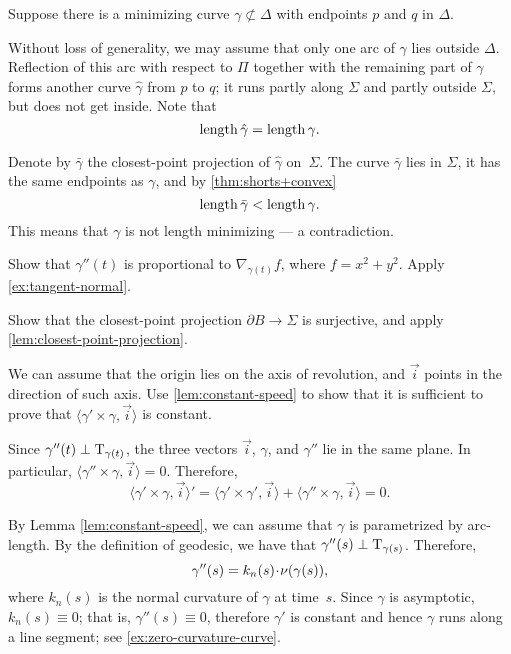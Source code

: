 \begin{multicols}{2}
Suppose there is a minimizing curve $\gamma\not\subset\Delta$ with endpoints $p$ and $q$ in $\Delta$.

Without loss of generality, we may assume that only one arc of $\gamma$ lies outside $\Delta$.
Reflection of this arc with respect to $\Pi$ together with the remaining part of $\gamma$ forms another curve $\hat\gamma$ from $p$ to $q$;
it runs partly along $\Sigma$ 
and partly outside $\Sigma$,
but does not get inside.
Note that
\[\mathop{\rm length}\nolimits\hat\gamma=\mathop{\rm length}\nolimits\gamma.\]


Denote by $\bar\gamma$ the closest-point projection of $\hat\gamma$ on~$\Sigma$.
The curve $\bar\gamma$ lies in $\Sigma$, 
it has the same endpoints as $\gamma$,
and by \ref{thm:shorts+convex}
\[\mathop{\rm length}\nolimits\bar\gamma<\mathop{\rm length}\nolimits\gamma.\]
This means that $\gamma$ is not length minimizing --- 
a contradiction.

 Show that $\gamma''(t)$ is proportional to $\nabla_{\gamma(t)} f$, where $f=x^2+y^2$. 
Apply \ref{ex:tangent-normal}.

Show that the closest-point projection $\partial B\to\Sigma$ is surjective, and apply \ref{lem:closest-point-projection}.


\setcounter{eqtn}{0}


We can assume that the origin lies on the axis of revolution, and $\vec i$ points in the direction of such axis.
Use \ref{lem:constant-speed} to show that it is sufficient to prove that 
$\langle\gamma'\times \gamma,\vec i\rangle$
is constant.

Since $\gamma''(t)\perp\mathrm{T}_{\gamma(t)}$, the three vectors $\vec i$, $\gamma$, and $\gamma''$ lie in the same plane.
In particular, $\langle\gamma''\times \gamma,\vec i\rangle=0$.
Therefore,
\[
\langle\gamma'\times \gamma,\vec i\rangle'
=
\langle\gamma'\times \gamma',\vec i\rangle+\langle\gamma''\times \gamma,\vec i\rangle =0
.\]



 By Lemma \ref{lem:constant-speed},
we can assume that $\gamma$ is parametrized by arc-length.
By the definition of geodesic, we have that $\gamma''(s)\perp\mathrm{T}_{\gamma(s)}$. 
Therefore, 
\[\gamma''(s)=k_n(s)\cdot\Norm(\gamma(s)),\]
where $k_n(s)$ is the normal curvature of $\gamma$ at time~$s$.
Since $\gamma$ is asymptotic, $k_n(s)\equiv 0$;
that is, $\gamma''(s)\equiv 0$, therefore $\gamma'$ is constant and hence $\gamma$ runs along a line segment; see \ref{ex:zero-curvature-curve}.





\end{multicols}
